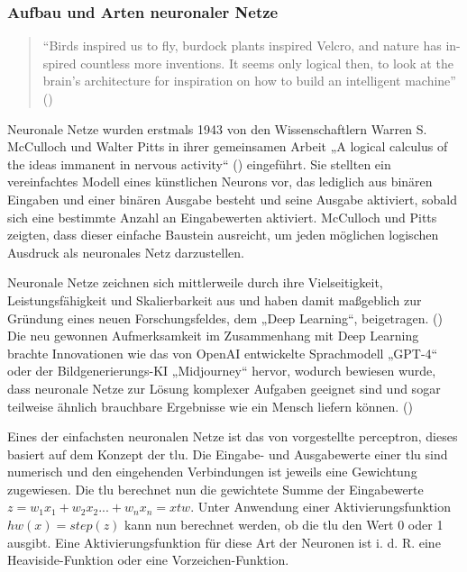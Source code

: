 \subsubsection{Aufbau und Arten neuronaler Netze}

\begin{quote}
  "`Birds inspired us to fly, burdock plants inspired Velcro, and nature has in- spired countless more inventions. It seems only logical then, to look at the brain’s architecture for inspiration on how to build an intelligent machine"' (\cite[S. 279]{Geron2019})
\end{quote}

Neuronale Netze wurden erstmals 1943 von den Wissenschaftlern Warren S. McCulloch und Walter Pitts in ihrer gemeinsamen Arbeit „A logical calculus of the ideas immanent in nervous activity“ (\cite{McCulloch1943}) eingeführt. Sie stellten ein vereinfachtes Modell eines künstlichen Neurons vor, das lediglich aus binären Eingaben und einer binären Ausgabe besteht und seine Ausgabe aktiviert, sobald sich eine bestimmte Anzahl an Eingabewerten aktiviert. McCulloch und Pitts zeigten, dass dieser einfache Baustein ausreicht, um jeden möglichen logischen Ausdruck als neuronales Netz darzustellen.

Neuronale Netze zeichnen sich mittlerweile durch ihre Vielseitigkeit, Leistungsfähigkeit und Skalierbarkeit aus und haben damit maßgeblich zur Gründung eines neuen Forschungsfeldes, dem „Deep Learning“, beigetragen. (\cite{Geron2019}) Die neu gewonnen Aufmerksamkeit im Zusammenhang mit Deep Learning brachte Innovationen wie das von OpenAI entwickelte Sprachmodell „GPT-4“ oder der Bildgenerierungs-KI „Midjourney“ hervor, wodurch bewiesen wurde, dass neuronale Netze zur Lösung komplexer Aufgaben geeignet sind und sogar teilweise ähnlich brauchbare Ergebnisse wie ein Mensch liefern können. (\cite{OpenAI2024})

Eines der einfachsten neuronalen Netze ist das von \cite{Rosenblatt1958} vorgestellte \gls{perceptron}, dieses basiert auf dem Konzept der \gls{tlu}. Die Eingabe- und Ausgabewerte einer \gls{tlu} sind numerisch und den eingehenden Verbindungen ist jeweils eine Gewichtung zugewiesen. Die \gls{tlu} berechnet nun die gewichtete Summe der Eingabewerte \(z=w_1x_1+w_2x_2 ... +w_nx_n=xtw\). Unter Anwendung einer Aktivierungsfunktion \(hw(x)=step(z)\) kann nun berechnet werden, ob die \gls{tlu} den Wert 0 oder 1 ausgibt. Eine Aktivierungsfunktion für diese Art der Neuronen ist i. d. R. eine Heaviside-Funktion oder eine Vorzeichen-Funktion. \cite[S. 284 ff.]{Geron2019}

